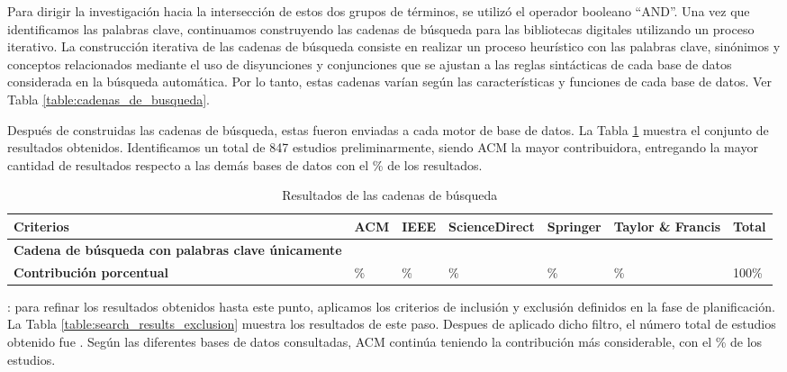 Para dirigir la investigación hacia la intersección de estos dos grupos de términos, se utilizó el operador booleano ``AND''. Una vez que identificamos las palabras clave, continuamos construyendo las cadenas de búsqueda para las bibliotecas digitales utilizando un proceso iterativo. La construcción iterativa de las cadenas de búsqueda consiste en realizar un proceso heurístico con las palabras clave, sinónimos y conceptos relacionados mediante el uso de disyunciones y conjunciones que se ajustan a las reglas sintácticas de cada base de datos considerada en la búsqueda automática. Por lo tanto, estas cadenas varían según las características y funciones de cada base de datos. Ver Tabla \ref{table:cadenas_de_busqueda}.

Después de construidas las cadenas de búsqueda, estas fueron enviadas a cada motor de base de datos. La Tabla \ref{table:search_results} muestra el conjunto de resultados obtenidos. Identificamos un total de 847 estudios preliminarmente, siendo ACM la mayor contribuidora, entregando la mayor cantidad de resultados respecto a las demás bases de datos con el \acmp\% de los resultados.



\begin{table}[htbp]
	\centering
	\caption{Resultados de las cadenas de búsqueda}
	\label{table:search_results}
	\begin{tabular}{p{4.5cm}p{1.5cm}p{1.5cm}p{2cm}p{1.8cm}p{1.8cm}p{1.5cm}}
		\toprule
		\textbf{Criterios}                                        & \textbf{ACM} & \textbf{IEEE} & \textbf{ScienceDirect} & \textbf{Springer} & \textbf{Taylor \& Francis} & \textbf{Total} \\
		\midrule
		\textbf{Cadena de búsqueda con palabras clave únicamente} & \acm{}       & \ieee{}       & \sd{}                  & \spr{}            & \tf{}                      & \tot{}         \\
		\addlinespace[0.8em]
		\textbf{Contribución porcentual}                          & \acmp{}\%    & \ieeep{}\%    & \sdp{}\%               & \sprp{}\%         & \tfp{}\%                   & 100\%          \\
		\bottomrule
	\end{tabular}
\end{table}




: para refinar los resultados obtenidos hasta este punto, aplicamos los criterios de inclusión y exclusión definidos en la fase de planificación. La Tabla \ref{table:search_results_exclusion} muestra los resultados de este paso. Despues de aplicado dicho filtro, el número total de estudios obtenido fue \itot. Según las diferentes bases de datos consultadas, ACM continúa teniendo la contribución más considerable, con el \iacmp\% de los estudios.




